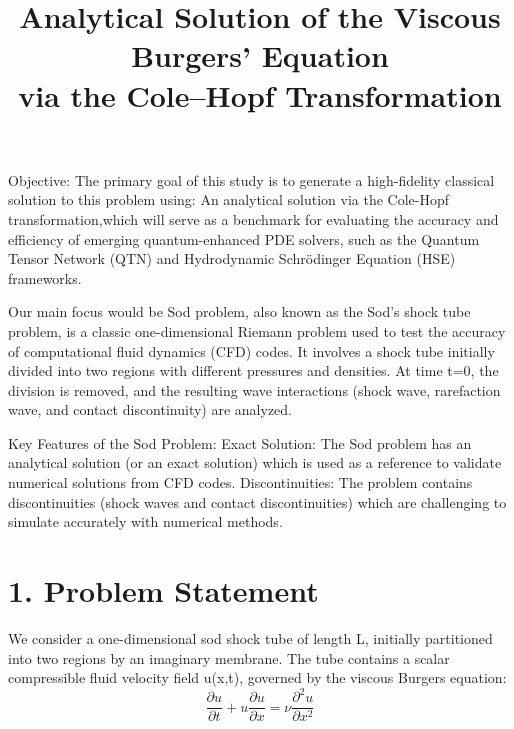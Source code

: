 \documentclass[12pt]{article}
\title{Analytical Solution of the Viscous Burgers’ Equation\\ via the Cole–Hopf Transformation}
\author{}
\date{}
\begin{document}
\maketitle
Objective:
The primary goal of this study is to generate a high-fidelity classical solution to this problem using:
An analytical solution via the Cole-Hopf transformation,which will serve as a benchmark for evaluating the accuracy and efficiency of emerging quantum-enhanced PDE solvers, such as the Quantum Tensor Network (QTN) and Hydrodynamic Schrödinger Equation (HSE) frameworks.
\vspace{2mm}

Our main focus would be Sod problem, also known as the Sod's shock tube problem, is a classic one-dimensional Riemann problem used to test the accuracy of computational fluid dynamics (CFD) codes. It involves a shock tube initially divided into two regions with different pressures and densities. At time t=0, the division is removed, and the resulting wave interactions (shock wave, rarefaction wave, and contact discontinuity) are analyzed. 

\vspace{3mm}

 Key Features of the Sod Problem:
Exact Solution:
The Sod problem has an analytical solution (or an exact solution) which is used as a reference to validate numerical solutions from CFD codes.
Discontinuities:
The problem contains discontinuities (shock waves and contact discontinuities) which are challenging to simulate accurately with numerical methods.



\section*{1. Problem Statement}

We consider a one-dimensional sod shock tube of length L, initially partitioned into two regions by an imaginary membrane. The tube contains a scalar compressible fluid velocity field u(x,t), governed by the viscous Burgers equation:
\begin{equation}
\frac{\partial u}{\partial t} + u \frac{\partial u}{\partial x} = \nu \frac{\partial^2 u}{\partial x^2}
\end{equation} 
\vspace{5mm}
\end{document}

